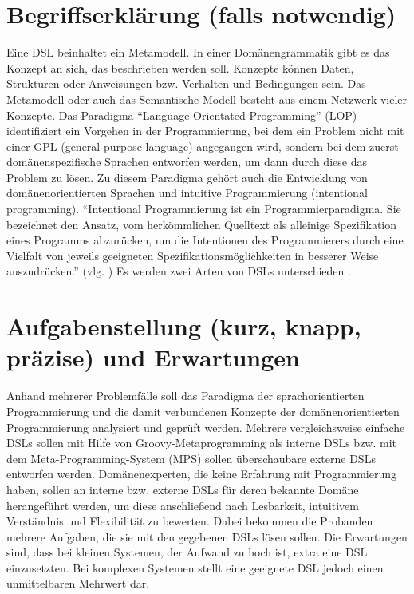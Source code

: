 \documentclass[11pt,english,ngerman, headsepline]{scrreprt}
\begin{document}
\section{Begriffserklärung (falls notwendig)}
Eine DSL beinhaltet ein Metamodell. In einer Domänengrammatik gibt es das
Konzept an sich, das beschrieben werden soll. Konzepte können Daten, Strukturen
oder Anweisungen bzw. Verhalten und Bedingungen sein. Das Metamodell oder auch
das Semantische Modell besteht aus einem Netzwerk vieler Konzepte. Das Paradigma
“Language Orientated Programming” (LOP) identifiziert ein Vorgehen in der
Programmierung, bei dem ein Problem nicht mit einer GPL (general purpose
language) angegangen wird, sondern bei dem zuerst domänenspezifische Sprachen
entworfen werden, um dann durch diese das Problem zu lösen. Zu diesem Paradigma
gehört auch die Entwicklung von domänenorientierten Sprachen und intuitive
Programmierung (intentional programming). “Intentional Programmierung ist ein
Programmierparadigma. Sie bezeichnet den Ansatz, vom herkömmlichen Quelltext als
alleinige Spezifikation eines Programms abzurücken, um die Intentionen des
Programmierers durch eine Vielfalt von jeweils geeigneten
Spezifikationsmöglichkeiten in besserer Weise auszudrücken.” (vlg.
\cite{wikiIntentional}) Es werden zwei Arten von DSLs unterschieden
\cite{fowler2011domain}. 


\section{Aufgabenstellung (kurz, knapp, präzise) und Erwartungen}

Anhand mehrerer Problemfälle soll das Paradigma der sprachorientierten
Programmierung und die damit verbundenen Konzepte der domänenorientierten
Programmierung analysiert und geprüft werden. Mehrere vergleichsweise einfache
DSLs sollen mit Hilfe von Groovy-Metaprogramming als interne DSLs bzw. mit dem
Meta-Programming-System (MPS) sollen überschaubare externe DSLs entworfen
werden. Domänenexperten, die keine Erfahrung mit Programmierung haben, sollen an
interne bzw. externe DSLs für deren bekannte Domäne herangeführt werden, um
diese anschließend nach Lesbarkeit, intuitivem Verständnis und Flexibilität zu
bewerten. Dabei bekommen die Probanden mehrere Aufgaben, die sie mit den
gegebenen DSLs lösen sollen.
Die Erwartungen sind, dass bei kleinen Systemen, der Aufwand zu hoch ist, extra
eine DSL einzusetzten. Bei komplexen Systemen stellt eine geeignete DSL jedoch
einen unmittelbaren Mehrwert dar.
\end{document}
